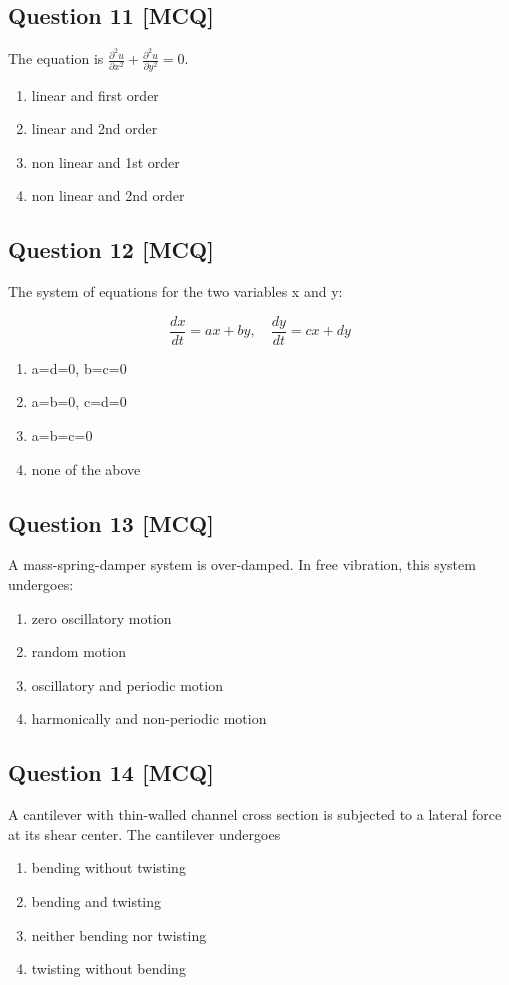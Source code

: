 \documentclass[12pt,a4paper]{article}
\begin{document}
\subsection*{Question 11 [MCQ]}
The equation is $\frac{\partial^2 u}{\partial x^2} + \frac{\partial^2 u}{\partial y^2} = 0$.
\begin{enumerate}[label=(\alph*)]
\item linear and first order
\item linear and 2nd order
\item non linear and 1st order
\item non linear and 2nd order
\end{enumerate}

\subsection*{Question 12 [MCQ]}
The system of equations for the two variables x and y:

\[
\frac{dx}{dt} = ax + by,\quad \frac{dy}{dt} = cx + dy
\]
\begin{enumerate}[label=(\alph*)]
\item a=d=0, b=c=0
\item a=b=0, c=d=0
\item a=b=c=0
\item none of the above
\end{enumerate}


\subsection*{Question 13 [MCQ]}
A mass-spring-damper system is over-damped. In free vibration, this system undergoes:
\begin{enumerate}[label=(\alph*)]
\item zero oscillatory motion
\item random motion
\item oscillatory and periodic motion
\item harmonically and non-periodic motion
\end{enumerate}


\subsection*{Question 14 [MCQ]}
A cantilever with thin-walled channel cross section is subjected to a lateral force at its shear center. The cantilever undergoes  
\begin{enumerate}[label=(\alph*)]
\item bending without twisting
\item bending and twisting
\item neither bending nor twisting 
\item twisting without bending
\end{enumerate}
\end{document}
